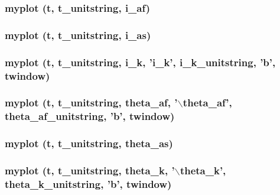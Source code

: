 \subsubsection[{myplot}]{\setlength{\rightskip}{0pt plus 5cm}myplot ({\bf t}, \/  {\bf t\_\-unitstring}, \/  {\bf i\_\-af})}\label{matlab_2dataviewer_8m_a14e423c7c62e818d1b08d0b3851db541}
\subsubsection[{myplot}]{\setlength{\rightskip}{0pt plus 5cm}myplot ({\bf t}, \/  {\bf t\_\-unitstring}, \/  {\bf i\_\-as})}\label{matlab_2dataviewer_8m_a3a335d1021b893d8bcb8ae2ed8599d28}
\subsubsection[{myplot}]{\setlength{\rightskip}{0pt plus 5cm}myplot ({\bf t}, \/  {\bf t\_\-unitstring}, \/  {\bf i\_\-k}, \/   '{\bf i\_\-k}', \/  {\bf i\_\-k\_\-unitstring}, \/  'b', \/  {\bf twindow})}\label{matlab_2dataviewer_8m_a62a893265eec5c022b28cf7369e1d723}
\subsubsection[{myplot}]{\setlength{\rightskip}{0pt plus 5cm}myplot ({\bf t}, \/  {\bf t\_\-unitstring}, \/  {\bf theta\_\-af}, \/  '$\backslash${\bf theta\_\-af}', \/  {\bf theta\_\-af\_\-unitstring}, \/  'b', \/  {\bf twindow})}\label{matlab_2dataviewer_8m_aa570e72dac77665a45a8f607e1105e6b}
\subsubsection[{myplot}]{\setlength{\rightskip}{0pt plus 5cm}myplot ({\bf t}, \/  {\bf t\_\-unitstring}, \/  {\bf theta\_\-as})}\label{matlab_2dataviewer_8m_ad11d3f72b156e0df35ad2ee3717bc34b}
\subsubsection[{myplot}]{\setlength{\rightskip}{0pt plus 5cm}myplot ({\bf t}, \/  {\bf t\_\-unitstring}, \/  {\bf theta\_\-k}, \/  '$\backslash${\bf theta\_\-k}', \/  {\bf theta\_\-k\_\-unitstring}, \/  'b', \/  {\bf twindow})}\label{matlab_2dataviewer_8m_a8ff3fe8164b53da2579b72b61ce7b173}
